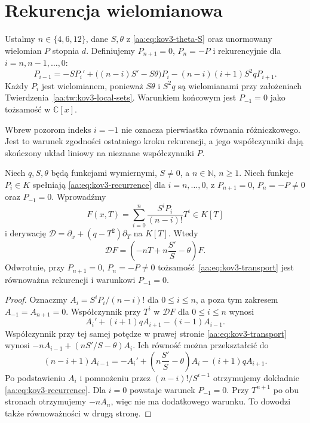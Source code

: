 \section{Rekurencja wielomianowa}

\begin{definicja}
\label{aa:def:kov3-recurrence}
Ustalmy $n\in\{4,6,12\}$,
dane $S,\theta$ z
\eqref{aa:eq:kov3-theta-S}
oraz unormowany wielomian
$P$ stopnia $d$.
Definiujemy
$P_{n+1}=0$, $P_n=-P$
i rekurencyjnie dla
$i=n,n-1,\ldots,0$:
\begin{equation}\label{aa:eq:kov3-recurrence}
 P_{i-1}
 =-SP_i'
 +\bigl((n-i)S'-S\theta\bigr)P_i
 -(n-i)(i+1)S^2qP_{i+1}.
\end{equation}
Każdy $P_i$ jest wielomianem,
ponieważ $S\theta$ i
$S^2q$ są wielomianami
przy założeniach
Twierdzenia~\ref{aa:tw:kov3-local-sets}.
Warunkiem końcowym jest
$P_{-1}=0$ jako tożsamość
w $\mathbb C[x]$.
\end{definicja}

Wbrew pozorom indeks $i=-1$
nie oznacza pierwiastka
równania różniczkowego.
Jest to warunek zgodności
ostatniego kroku rekurencji,
a jego współczynniki
dają skończony układ
liniowy na nieznane
współczynniki $P$.

\begin{lemat}
\label{aa:lem:kov3-transport}
Niech $q,S,\theta$ będą
funkcjami wymiernymi,
$S\ne0$, a $n\in\mathbb N$, $n\ge1$.
Niech funkcje $P_i\in K$
spełniają
\eqref{aa:eq:kov3-recurrence}
dla $i=n,\ldots,0$,
z $P_{n+1}=0$, $P_n=-P\ne0$
oraz $P_{-1}=0$.
Wprowadźmy
\begin{equation}\label{aa:eq:kov3-polynomial-F}
 F(x,T)=\sum_{i=0}^{n}
          \frac{S^iP_i}{(n-i)!}T^i\in K[T]
\end{equation}
i derywację
$\mathcal D=\partial_x+(q-T^2)\partial_T$
na $K[T]$.
Wtedy
\begin{equation}\label{aa:eq:kov3-transport}
 \mathcal DF
 =\left(-nT+n\frac{S'}S-\theta\right)F.
\end{equation}
Odwrotnie, przy
$P_{n+1}=0$, $P_n=-P\ne0$
tożsamość~\eqref{aa:eq:kov3-transport}
jest równoważna rekurencji
i warunkowi $P_{-1}=0$.
\end{lemat}
\begin{proof}
Oznaczmy
$A_i=S^iP_i/(n-i)!$ dla
$0\le i\le n$, a poza tym
zakresem $A_{-1}=A_{n+1}=0$.
Współczynnik przy $T^i$
w $\mathcal DF$ dla
$0\le i\le n$ wynosi
\[
 A_i'+(i+1)qA_{i+1}-(i-1)A_{i-1}.
\]
Współczynnik przy tej samej
potędze w prawej stronie
\eqref{aa:eq:kov3-transport}
wynosi
$-nA_{i-1}+
 (nS'/S-\theta)A_i$.
Ich równość można
przekształcić do
\[
 (n-i+1)A_{i-1}
 =-A_i'+\left(n\frac{S'}S-\theta\right)A_i
 -(i+1)qA_{i+1}.
\]
Po podstawieniu $A_i$
i pomnożeniu przez
$(n-i)!/S^{i-1}$
otrzymujemy dokładnie
\eqref{aa:eq:kov3-recurrence}.
Dla $i=0$ powstaje
warunek $P_{-1}=0$.
Przy $T^{n+1}$ po obu
stronach otrzymujemy
$-nA_n$, więc nie ma
dodatkowego warunku.
To dowodzi także
równoważności w drugą stronę.
\end{proof}

